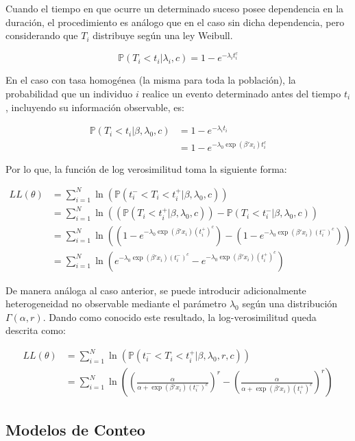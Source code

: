 \documentclass[
]{book}
\begin{document}
Cuando el tiempo en que ocurre un determinado suceso posee dependencia
en la duración, el procedimiento es análogo que en el caso sin dicha
dependencia, pero considerando que \(T_i\) distribuye según una ley
Weibull.

\[\mathbb{P}(T_i < t_i|\lambda_i,c) = 1 - e^{-\lambda_it_i^c}\]

En el caso con tasa homogénea (la misma para toda la población), la
probabilidad que un individuo \(i\) realice un evento determinado antes
del tiempo \(t_i\), incluyendo su información observable, es:

\[
\begin{aligned}
\mathbb{P}(T_i < t_i|\beta,\lambda_0,c) &= 1 - e^{-\lambda_i t_i}\\
&= 1 - e^{-\lambda_0 \exp(\beta'x_i) t_i^c}
\end{aligned}
\]

Por lo que, la función de log verosimilitud toma la siguiente forma:

\[
\begin{aligned}
LL(\theta) &= \sum_{i=1}^{N} \ln(\mathbb{P}(t_i^- < T_i < t_i^+|\beta,\lambda_0,c)) \\
&= \sum_{i=1}^{N} \ln((\mathbb{P}(T_i < t_i^+|\beta,\lambda_0,c)) - \mathbb{P}(T_i < t_i^-|\beta,\lambda_0,c)) \\
&=  \sum_{i=1}^{N} \ln \left((1 - e^{-\lambda_0 \exp(\beta'x_i)(t_i^+)^c}) - (1 - e^{-\lambda_0 \exp(\beta'x_i)(t_i^-)^c}) \right)\\
&= \sum_{i=1}^{N} \ln (e^{-\lambda_0 \exp(\beta'x_i)(t_i^-)^c} - e^{-\lambda_0 \exp(\beta'x_i)(t_i^+)^c})
\end{aligned}
\]

De manera análoga al caso anterior, se puede introducir adicionalmente
heterogeneidad no observable mediante el parámetro \(\lambda_0\) según una
distribución \(\Gamma(\alpha,r)\). Dando como conocido este resultado, la
log-verosimilitud queda descrita como:

\[
\begin{aligned}
LL(\theta) &= \sum_{i=1}^{N} \ln(\mathbb{P}(t_i^- < T_i < t_i^+|\beta,\lambda_0,r,c)) \\
&= \sum_{i=1}^{N} \ln \left( \left(\frac{\alpha}{\alpha + \exp(\beta'x_i)(t_i^-)^c}\right)^r - \left(\frac{\alpha}{\alpha + \exp(\beta'x_i)(t_i^+)^c}\right)^r \right)
\end{aligned}
\]

\subsection{Modelos de Conteo}\label{modelos-de-conteo-1}
\end{document}
